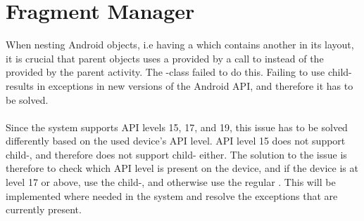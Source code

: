 \section{Fragment Manager}
\label{sec:fragment_manager}

When nesting Android  objects, i.e having a  which contains another  in its layout, it is crucial that parent  objects uses a  provided by a call to  instead of the  provided by the parent activity. The \giraf-class  failed to do this. Failing to use child- results in exceptions in new versions of the Android API, and therefore it has to be solved. 
\\\\
Since the \giraf system supports API levels 15, 17, and 19, this issue has to be solved differently based on the used device's API level. API level 15 does not support child-, and therefore does not support child- either. The solution to the issue is therefore to check which API level is present on the device, and if the device is at level 17 or above, use the child-, and otherwise use the regular . This will be implemented where needed in the \giraf system and resolve the exceptions that are currently present.

